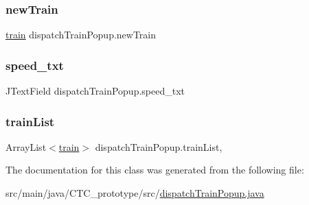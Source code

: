 \subsubsection{\texorpdfstring{new\+Train}{newTrain}}
{\footnotesize\ttfamily \hyperlink{classtrain}{train} dispatch\+Train\+Popup.\+new\+Train\hspace{0.3cm}{\ttfamily [private]}}

\mbox{\label{classdispatchTrainPopup_a16bb03a5f638b24aeed36ef422cfbe7b}} 
\subsubsection{\texorpdfstring{speed\+\_\+txt}{speed\_txt}}
{\footnotesize\ttfamily J\+Text\+Field dispatch\+Train\+Popup.\+speed\+\_\+txt\hspace{0.3cm}{\ttfamily [private]}}

\mbox{\label{classdispatchTrainPopup_aeb7e9142a54631b84a4d72dc4b7913dd}} 
\subsubsection{\texorpdfstring{train\+List}{trainList}}
{\footnotesize\ttfamily Array\+List$<$\hyperlink{classtrain}{train}$>$ dispatch\+Train\+Popup.\+train\+List\hspace{0.3cm}{\ttfamily [static]}, {\ttfamily [private]}}



The documentation for this class was generated from the following file\+:\begin{DoxyCompactItemize}
\item 
src/main/java/\+C\+T\+C\+\_\+prototype/src/\hyperlink{dispatchTrainPopup_8java}{dispatch\+Train\+Popup.\+java}\end{DoxyCompactItemize}
